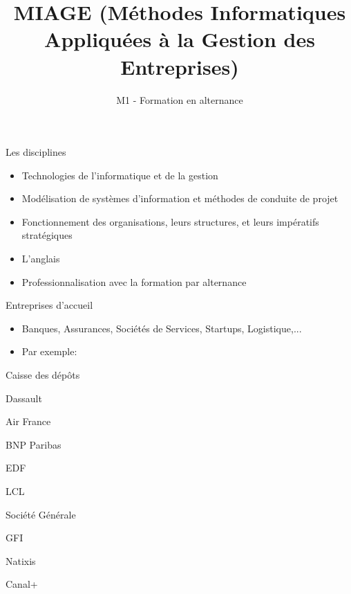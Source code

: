 \documentclass[minimal,compress]{beamer}
\title[M1 MIAGE en alternance]
{MIAGE (Méthodes Informatiques Appliquées à la Gestion des Entreprises)}
\subtitle{}
\author{M1 - Formation en alternance}
\institute{\url{https://github.com/Dauphine-MIDO/M1-alternance/}\\
(cliquer sur \texttt{\href{https://github.com/Dauphine-MIDO/M1-alternance/blob/master/README.adoc}{README.adoc}})}%
\date{}
\begin{document}




\begin{frame}{Les disciplines}
\begin{itemize}
\item Technologies de l’\alert{informatique} et de la \alert{gestion}

\item Modélisation de \alert{systèmes d’information} et méthodes de \alert{conduite de projet}

\item Fonctionnement des organisations, leurs structures, et leurs impératifs stratégiques

\item L’anglais %

\item \alert{Professionnalisation} avec la formation par alternance
\end{itemize}
\end{frame}

\begin{frame}{Entreprises d'accueil}

\begin{itemize}
\item Banques, Assurances, Sociétés de Services, Startups, Logistique,...
\item Par exemple:
\end{itemize}

\centering
\begin{minipage}{.35\textwidth}
 Caisse des dépôts
 
 Dassault
 
 Air France
 
BNP Paribas

 EDF
 

\end{minipage}
\begin{minipage}{.35\textwidth}
 LCL
 
 Société Générale
 
GFI

 Natixis
 
 Canal+

\end{minipage}



\end{frame}
\end{document}
